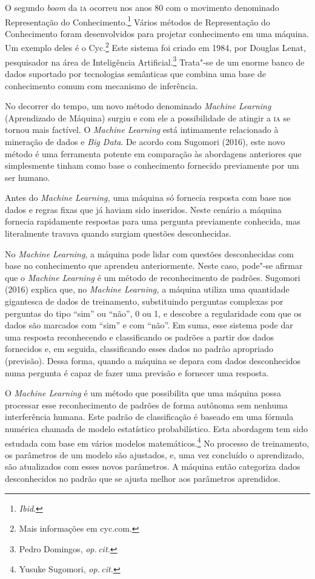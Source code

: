 O segundo \textit{boom} da \textsc{ia} ocorreu nos anos 80 com o movimento
denominado Representação do Conhecimento.\footnote{\textit{Ibid}.} Vários
métodos de Representação do Conhecimento foram desenvolvidos para
projetar conhecimento em uma máquina. Um exemplo deles é o Cyc.\footnote{Mais informações em cyc.com.}
Este sistema foi criado em 1984, por Douglas Lenat, pesquisador na área
de Inteligência Artificial.\footnote{Pedro Domingos, \textit{op.\,cit.}}
Trata"-se de um enorme banco
de dados suportado por tecnologias semânticas que combina uma base de
conhecimento comum com mecanismo de inferência.

No decorrer do tempo, um novo método denominado \textit{Machine Learning}
(Aprendizado de Máquina) surgiu e com ele a possibilidade de atingir a
\textsc{ia} se tornou mais factível. O \textit{Machine Learning} está intimamente
relacionado à mineração de dados e \textit{Big Data}. De acordo com
Sugomori (2016), este novo método é uma ferramenta potente em comparação
às abordagens anteriores que simplesmente tinham como base o
conhecimento fornecido previamente por um ser humano.

Antes do \textit{Machine Learning,} uma máquina só fornecia resposta com
base nos dados e regras fixas que já haviam sido inseridos. Neste
cenário a máquina fornecia rapidamente respostas para uma pergunta
previamente conhecida, mas literalmente travava quando surgiam questões
desconhecidas.

No \textit{Machine Learning}, a máquina pode lidar com questões
desconhecidas com base no conhecimento que aprendeu anteriormente. Neste
caso, pode"-se afirmar que o \textit{Machine Learning} é um método de
reconhecimento de padrões. Sugomori (2016) explica que, no \textit{Machine
Learning,} a máquina utiliza uma quantidade gigantesca de dados de
treinamento, substituindo perguntas complexas por perguntas do tipo
``sim'' ou ``não'', 0 ou 1, e descobre a regularidade com que os dados
são marcados com ``sim'' e com ``não''. Em suma, esse sistema pode dar
uma resposta reconhecendo e classificando os padrões a partir dos dados
fornecidos e, em seguida, classificando esses dados no padrão apropriado
(previsão). Dessa forma, quando a máquina se depara com dados
desconhecidos numa pergunta é capaz de fazer uma previsão e fornecer uma
resposta.

O \textit{Machine Learning} é um método que possibilita que uma máquina
possa processar esse reconhecimento de padrões de forma autônoma sem
nenhuma interferência humana. Este padrão de classificação é baseado em
uma fórmula numérica chamada de modelo estatístico probabilístico. Esta
abordagem tem sido estudada com base em vários modelos matemáticos.\footnote{Yusuke Sugomori, \textit{op.\,cit.}} 
No processo de treinamento, os parâmetros de um modelo
são ajustados, e, uma vez concluído o aprendizado, são atualizados com
esses novos parâmetros. A máquina então categoriza dados desconhecidos
no padrão que se ajusta melhor aos parâmetros aprendidos.

